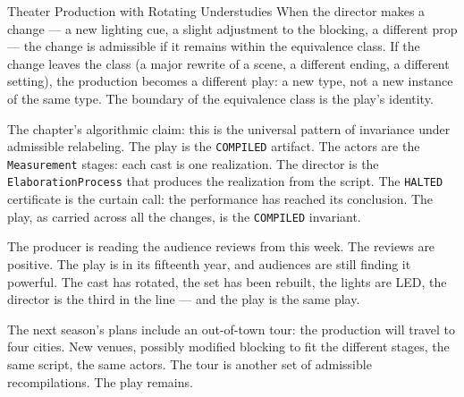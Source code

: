 \begin{coda}{Theater Production with Rotating Understudies}
When the director makes a change --- a new lighting cue, a slight
adjustment to the blocking, a different prop --- the change is
admissible if it remains within the equivalence class. If the
change leaves the class (a major rewrite of a scene, a different
ending, a different setting), the production becomes a different
play: a new type, not a new instance of the same type. The
boundary of the equivalence class is the play's identity.

The chapter's algorithmic claim: this is the universal pattern of
invariance under admissible relabeling. The play is the
\texttt{COMPILED} artifact. The actors are the
\texttt{Measurement} stages: each cast is one realization. The
director is the \texttt{ElaborationProcess} that produces the
realization from the script. The \texttt{HALTED} certificate is
the curtain call: the performance has reached its conclusion. The
play, as carried across all the changes, is the
\texttt{COMPILED} invariant.

The producer is reading the audience reviews from this week. The
reviews are positive. The play is in its fifteenth year, and
audiences are still finding it powerful. The cast has rotated, the
set has been rebuilt, the lights are LED, the director is the
third in the line --- and the play is the same play.

The next season's plans include an out-of-town tour: the production
will travel to four cities. New venues, possibly modified blocking
to fit the different stages, the same script, the same actors. The
tour is another set of admissible recompilations. The play remains.

\end{coda}
